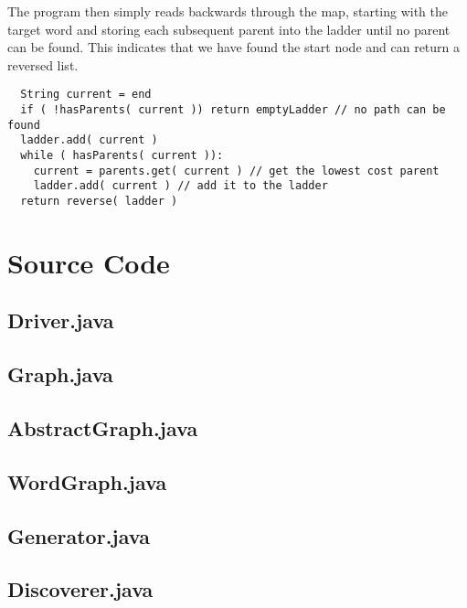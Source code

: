 \documentclass[12pt, titlepage, a4paper, oneside]{article}
\begin{document}
\par
The program then simply reads backwards through the map, starting with the target
word and storing each subsequent parent into the ladder until no parent can be
found. This indicates that we have found the start node and can return a
reversed list.
\begin{verbatim}
  String current = end
  if ( !hasParents( current )) return emptyLadder // no path can be found
  ladder.add( current )
  while ( hasParents( current )):
    current = parents.get( current ) // get the lowest cost parent
    ladder.add( current ) // add it to the ladder
  return reverse( ladder )
\end{verbatim}

\newpage
\section*{Source Code}

\subsection*{Driver.java}

\newpage

\subsection*{Graph.java}

\newpage

\subsection*{AbstractGraph.java}

\newpage

\subsection*{WordGraph.java}

\newpage

\subsection*{Generator.java}

\newpage

\subsection*{Discoverer.java}

\newpage
\end{document}
